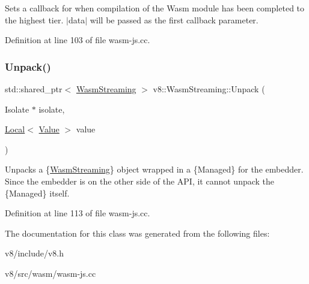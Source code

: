 Sets a callback for when compilation of the Wasm module has been completed to the highest tier. $\vert$data$\vert$ will be passed as the first callback parameter. 

Definition at line 103 of file wasm-\/js.\+cc.

\mbox{\label{classv8_1_1WasmStreaming_af90e13f9116c9c4184b6e621c87671c6}} 
\subsubsection{\texorpdfstring{Unpack()}{Unpack()}}
{\footnotesize\ttfamily std\+::shared\+\_\+ptr$<$ \mbox{\hyperlink{classv8_1_1WasmStreaming}{Wasm\+Streaming}} $>$ v8\+::\+Wasm\+Streaming\+::\+Unpack (\begin{DoxyParamCaption}\item[{Isolate $\ast$}]{isolate,  }\item[{\mbox{\hyperlink{classv8_1_1Local}{Local}}$<$ \mbox{\hyperlink{classv8_1_1Value}{Value}} $>$}]{value }\end{DoxyParamCaption})\hspace{0.3cm}{\ttfamily [static]}}

Unpacks a \{\mbox{\hyperlink{classv8_1_1WasmStreaming}{Wasm\+Streaming}}\} object wrapped in a \{Managed\} for the embedder. Since the embedder is on the other side of the A\+PI, it cannot unpack the \{Managed\} itself. 

Definition at line 113 of file wasm-\/js.\+cc.



The documentation for this class was generated from the following files\+:\begin{DoxyCompactItemize}
\item 
v8/include/v8.\+h\item 
v8/src/wasm/wasm-\/js.\+cc\end{DoxyCompactItemize}
